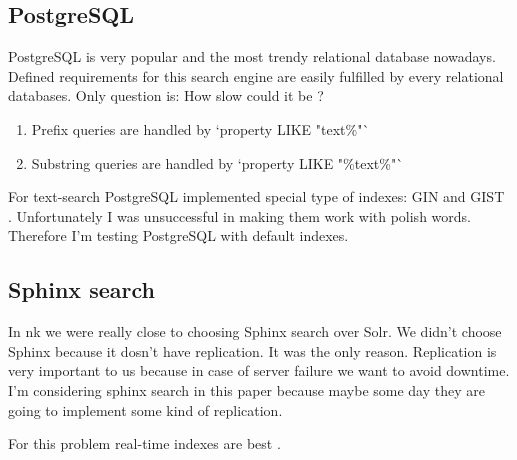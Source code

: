 \documentclass[10pt,a4paper]{article}
\begin{document}
\subsection{PostgreSQL}

PostgreSQL is very popular and the most trendy relational database nowadays. Defined requirements for this search engine are easily fulfilled by every relational databases. Only question is: How slow could it be ?

\begin{enumerate}
\item Prefix queries are handled by `property LIKE "text\%"`
\item Substring queries are handled by `property LIKE "\%text\%"`
\end{enumerate}

For text-search PostgreSQL implemented special type of indexes: GIN \cite{PSQLGIN} and GIST \cite{PSQLGIST}. Unfortunately I was unsuccessful in making them work with polish words. Therefore I'm testing PostgreSQL with default indexes.

\subsection{Sphinx search}

In nk we were really close to choosing Sphinx search over Solr. We didn't choose Sphinx because it dosn't have replication. It was the only reason. Replication is very important to us because in case of server failure we want to avoid downtime. I'm considering sphinx search in this paper because maybe some day they are going to implement some kind of replication.

For this problem real-time indexes are best \cite{SPHINXRT}.

\end{document}
